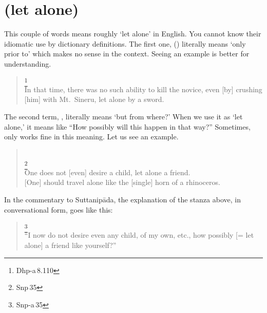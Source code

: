 {}
\section*{ (let alone)}

This couple of words means roughly `let alone' in English. You cannot know their idiomatic use by dictionary definitions. The first one,  () literally means `only prior to' which makes no sense in the context. Seeing an example is better for understanding.

\begin{quote}
\footnote{Dhp-a\,8.110}\\
In that time, there was no such ability to kill the novice, even [by] crushing [him] with Mt.\ Sineru, let alone by a sword.
\end{quote}

The second term, , literally means `but from where?' When we use it as `let alone,' it means like ``How possibly will this happen in that way?'' Sometimes, only  works fine in this meaning. Let us see an example.

\begin{quote}
\\
\footnote{Snp\,35}\\
One does not [even] desire a child, let alone a friend.\\
{[One]} should travel alone like the [single] horn of a rhinoceros.\\
\end{quote}

In the commentary to Suttanip\=ada, the explanation of the stanza above, in conversational form, goes like this:

\begin{quote}
\footnote{Snp-a\,35}\\
``I now do not desire even any child, of my own, etc., how possibly [= let alone] a friend like yourself?''\\
\end{quote}

